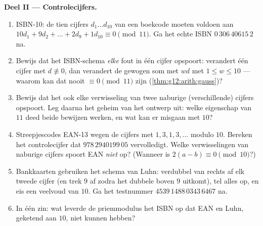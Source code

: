 \begin{problem}
\medskip
\noindent\textbf{Deel II --- Controlecijfers.}
\begin{enumerate}[resume]
  \item ISBN-10: de tien cijfers $d_1 \dots d_{10}$ van een boekcode moeten
        voldoen aan
        $10d_1 + 9d_2 + \dots + 2d_9 + 1d_{10} \equiv 0 \pmod{11}$. Ga het
        echte ISBN $0\,306\,40615\,2$ na.
  \item Bewijs dat het ISBN-schema \emph{elke} fout in één cijfer opspoort:
        verandert één cijfer met $d \not\equiv 0$, dan verandert de gewogen
        som met $w d$ met $1 \leq w \leq 10$ --- waarom kan dat nooit
        $\equiv 0 \pmod{11}$ zijn (\cref{thm:g12:arith:gauss})?
  \item Bewijs dat het ook elke verwisseling van twee naburige (verschillende)
        cijfers opspoort. Leg daarna het geheim van het ontwerp uit: welke
        eigenschap van $11$ deed beide bewijzen werken, en wat kan er misgaan
        met  $10$?
  \item Streepjescodes EAN-13 wegen de cijfers met $1, 3, 1, 3, \dots$ modulo
        $10$. Bereken het controlecijfer dat $978\,2940199\,05$ vervolledigt.
        Welke verwisselingen van naburige cijfers spoort EAN \emph{niet} op?
        (Wanneer is $2(a - b) \equiv 0 \pmod{10}$?)
  \item Bankkaarten gebruiken het schema van Luhn: verdubbel van rechts af
        elk tweede cijfer (en trek $9$ af zodra het dubbele boven $9$ uitkomt),
        tel alles op, en eis een veelvoud van $10$. Ga het testnummer
        $4539\,1488\,0343\,6467$ na.
  \item In één zin: wat leverde de priemmodulus het ISBN op dat EAN en Luhn,
        geketend aan $10$, niet kunnen hebben?
\end{enumerate}


\end{problem}
